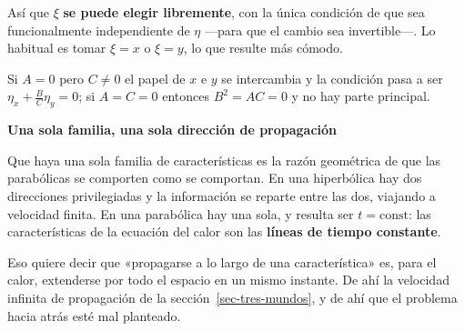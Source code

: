 \documentclass[
  spanish,
  a4paper,
]{scrbook}
\theoremstyle{definition}
\theoremstyle{plain}
\theoremstyle{definition}
\theoremstyle{plain}
\theoremstyle{definition}
\theoremstyle{remark}
\begin{document}
Así que \(\xi\) \textbf{se puede elegir libremente}, con la única
condición de que sea funcionalmente independiente de \(\eta\) ---para
que el cambio sea invertible---. Lo habitual es tomar \(\xi = x\) o
\(\xi = y\), lo que resulte más cómodo.

Si \(A = 0\) pero \(C \neq 0\) el papel de \(x\) e \(y\) se intercambia
y la condición pasa a ser \(\eta_x + \tfrac{B}{C}\eta_y = 0\); si
\(A = C = 0\) entonces \(B^2 = AC = 0\) y no hay parte principal.

\begin{tcolorbox}[enhanced jigsaw, arc=.35mm, bottomrule=.15mm, breakable, colback=white, colframe=quarto-callout-tip-color-frame, left=2mm, leftrule=.75mm, opacityback=0, rightrule=.15mm, toprule=.15mm]
\begin{minipage}[t]{5.5mm}
\textcolor{quarto-callout-tip-color}{\faLightbulb}
\end{minipage}%
\begin{minipage}[t]{\textwidth - 5.5mm}

\vspace{-3mm}\textbf{Una sola familia, una sola dirección de propagación}\vspace{3mm}

Que haya una sola familia de características es la razón geométrica de
que las parabólicas se comporten como se comportan. En una hiperbólica
hay dos direcciones privilegiadas y la información se reparte entre las
dos, viajando a velocidad finita. En una parabólica hay una sola, y
resulta ser \(t = \text{const}\): las características de la ecuación del
calor son las \textbf{líneas de tiempo constante}.

Eso quiere decir que «propagarse a lo largo de una característica» es,
para el calor, extenderse por todo el espacio en un mismo instante. De
ahí la velocidad infinita de propagación de la
sección~\ref{sec-tres-mundos}, y de ahí que el problema hacia atrás esté
mal planteado.

\end{minipage}%
\end{tcolorbox}
\end{document}
